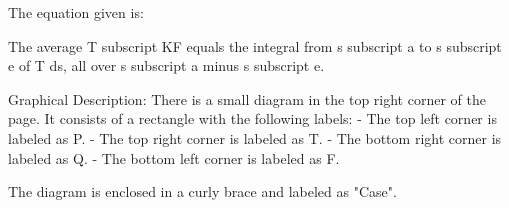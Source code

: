 The equation given is:

The average T subscript KF equals the integral from s subscript a to s subscript e of T ds, all over s subscript a minus s subscript e.

Graphical Description:
There is a small diagram in the top right corner of the page. It consists of a rectangle with the following labels:
- The top left corner is labeled as P.
- The top right corner is labeled as T.
- The bottom right corner is labeled as Q.
- The bottom left corner is labeled as F.

The diagram is enclosed in a curly brace and labeled as "Case".